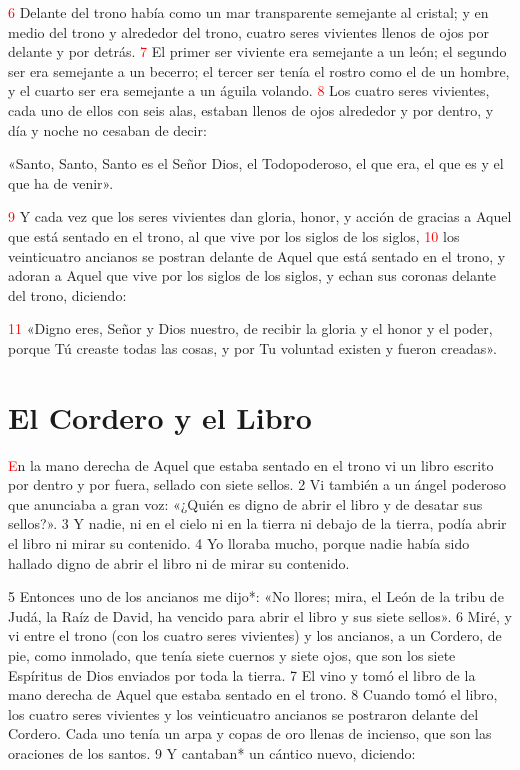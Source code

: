 \documentclass[12pt,twocolumn,twoside]{book}
\newcommand{\vnum}[1]{\textcolor{red}{\normalsize{#1}}}
\begin{document}
\vnum{6} Delante del trono había como un mar transparente semejante al cristal; y en medio del trono y alrededor del trono, cuatro seres vivientes llenos de ojos por delante y por detrás. %
\vnum{7} El primer ser viviente era semejante a un león; el segundo ser era semejante a un becerro; el tercer ser tenía el rostro como el de un hombre, y el cuarto ser era semejante a un águila volando. %
\vnum{8} Los cuatro seres vivientes, cada uno de ellos con seis alas, estaban llenos de ojos alrededor y por dentro, y día y noche no cesaban de decir:

«Santo, Santo, Santo es el Señor Dios, el Todopoderoso, el que era, el que es y el que ha de venir».

\vnum{9} Y cada vez que los seres vivientes dan gloria, honor, y acción de gracias a Aquel que está sentado en el trono, al que vive por los siglos de los siglos, %
\vnum{10} los veinticuatro ancianos se postran delante de Aquel que está sentado en el trono, y adoran a Aquel que vive por los siglos de los siglos, y echan sus coronas delante del trono, diciendo:

\vnum{11} «Digno eres, Señor y Dios nuestro, de recibir la gloria y el honor y el poder, porque Tú creaste todas las cosas, y por Tu voluntad existen y fueron creadas».

\chapter{El Cordero y el Libro}
\lettrine[lines=4]{\textcolor{red}{E}}{}n la mano derecha de Aquel que estaba sentado en el trono vi un libro escrito por dentro y por fuera, sellado con siete sellos. 2 Vi también a un ángel poderoso que anunciaba a gran voz: «¿Quién es digno de abrir el libro y de desatar sus sellos?». 3 Y nadie, ni en el cielo ni en la tierra ni debajo de la tierra, podía abrir el libro ni mirar su contenido. 4 Yo lloraba mucho, porque nadie había sido hallado digno de abrir el libro ni de mirar su contenido.

5 Entonces uno de los ancianos me dijo*: «No llores; mira, el León de la tribu de Judá, la Raíz de David, ha vencido para abrir el libro y sus siete sellos». 6 Miré, y vi entre el trono (con los cuatro seres vivientes) y los ancianos, a un Cordero, de pie, como inmolado, que tenía siete cuernos y siete ojos, que son los siete Espíritus de Dios enviados por toda la tierra. 7 El vino y tomó el libro de la mano derecha de Aquel que estaba sentado en el trono. 8 Cuando tomó el libro, los cuatro seres vivientes y los veinticuatro ancianos se postraron delante del Cordero. Cada uno tenía un arpa y copas de oro llenas de incienso, que son las oraciones de los santos. 9 Y cantaban* un cántico nuevo, diciendo:
\end{document}
